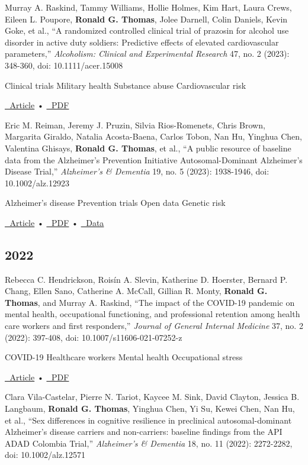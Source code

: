 \documentclass[
  letterpaper,
  DIV=11,
  numbers=noendperiod]{scrartcl}
\begin{document}
Murray A. Raskind, Tammy Williams, Hollie Holmes, Kim Hart, Laura Crews,
Eileen L. Poupore, \textbf{Ronald G. Thomas}, Jolee Darnell, Colin
Daniels, Kevin Goke, et al., ``A randomized controlled clinical trial of
prazosin for alcohol use disorder in active duty soldiers: Predictive
effects of elevated cardiovascular parameters,'' \emph{Alcoholism:
Clinical and Experimental Research} 47, no. 2 (2023): 348-360, doi:
10.1111/acer.15008

{Clinical trials} {Military health} {Substance abuse} {Cardiovascular
risk}

\href{https://doi.org/10.1111/acer.15008}{🔗 Article} •
\href{https://doi.org/10.1111/acer.15008}{📄 PDF}

Eric M. Reiman, Jeremy J. Pruzin, Silvia Rios-Romenets, Chris Brown,
Margarita Giraldo, Natalia Acosta-Baena, Carlos Tobon, Nan Hu, Yinghua
Chen, Valentina Ghisays, \textbf{Ronald G. Thomas}, et al., ``A public
resource of baseline data from the Alzheimer's Prevention Initiative
Autosomal-Dominant Alzheimer's Disease Trial,'' \emph{Alzheimer's \&
Dementia} 19, no. 5 (2023): 1938-1946, doi: 10.1002/alz.12923

{Alzheimer's disease} {Prevention trials} {Open data} {Genetic risk}

\href{https://doi.org/10.1002/alz.12923}{🔗 Article} •
\href{https://doi.org/10.1002/alz.12923}{📄 PDF} •
\href{https://doi.org/10.1002/alz.12923}{💾 Data}

\subsection{2022}\label{section-2}

Rebecca C. Hendrickson, Roisín A. Slevin, Katherine D. Hoerster, Bernard
P. Chang, Ellen Sano, Catherine A. McCall, Gillian R. Monty,
\textbf{Ronald G. Thomas}, and Murray A. Raskind, ``The impact of the
COVID-19 pandemic on mental health, occupational functioning, and
professional retention among health care workers and first responders,''
\emph{Journal of General Internal Medicine} 37, no. 2 (2022): 397-408,
doi: 10.1007/s11606-021-07252-z

{COVID-19} {Healthcare workers} {Mental health} {Occupational stress}

\href{https://doi.org/10.1007/s11606-021-07252-z}{🔗 Article} •
\href{https://doi.org/10.1007/s11606-021-07252-z}{📄 PDF}

Clara Vila-Castelar, Pierre N. Tariot, Kaycee M. Sink, David Clayton,
Jessica B. Langbaum, \textbf{Ronald G. Thomas}, Yinghua Chen, Yi Su,
Kewei Chen, Nan Hu, et al., ``Sex differences in cognitive resilience in
preclinical autosomal-dominant Alzheimer's disease carriers and
non-carriers: baseline findings from the API ADAD Colombia Trial,''
\emph{Alzheimer's \& Dementia} 18, no. 11 (2022): 2272-2282, doi:
10.1002/alz.12571
\end{document}
